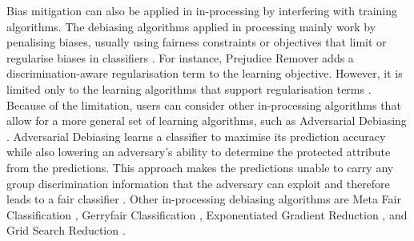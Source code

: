 \documentclass[sigconf]{acmart}
\begin{document}
	Bias mitigation can also be applied in in-processing by interfering with training algorithms. The debiasing algorithms applied in processing mainly work by penalising biases, usually using fairness constraints or objectives that limit or regularise biases in classifiers \cite{mahoney2020ai}. For instance, Prejudice Remover \cite{kamishima2012prejudice} adds a discrimination-aware regularisation term to the learning objective. However, it is limited only to the learning algorithms that support regularisation terms \cite{mahoney2020ai,ibmaif3602022guidance}. Because of the limitation, users can consider other in-processing algorithms that allow for a more general set of learning algorithms, such as Adversarial Debiasing \cite{mahoney2020ai,ibmaif3602022guidance}. Adversarial Debiasing \cite{zhang2018adversarial} learns a classifier to maximise its prediction accuracy while also lowering an adversary's ability to determine the protected attribute from the predictions. This approach makes the predictions unable to carry any group discrimination information that the adversary can exploit and therefore leads to a fair classifier \cite{ibmaif3602022guidance}. Other in-processing debiasing algorithms are Meta Fair Classification \cite{celis2019metafair}, Gerryfair Classification \cite{kearns2018gerry,kearns2019gerry}, Exponentiated Gradient Reduction \cite{agarwal18grid}, and Grid Search Reduction \cite{agarwal18grid,agarwal19grid}.
	
\end{document}
